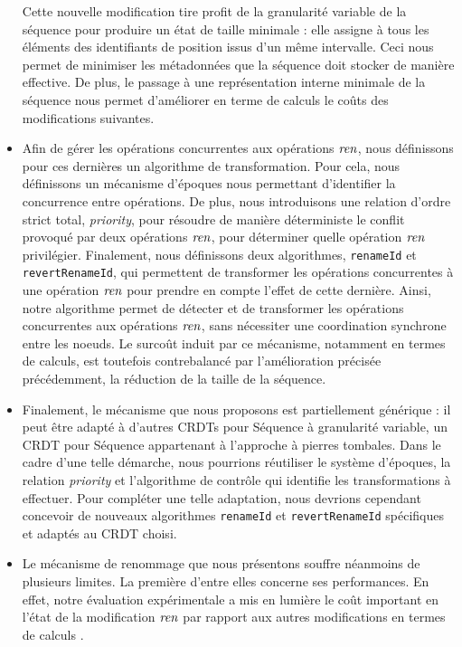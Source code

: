 \begin{itemize}
        Cette nouvelle modification tire profit de la granularité variable de la séquence pour produire un état de taille minimale : elle assigne à tous les éléments des identifiants de position issus d'un même intervalle.
        Ceci nous permet de minimiser les métadonnées que la séquence doit stocker de manière effective.
        De plus, le passage à une représentation interne minimale de la séquence nous permet d'améliorer en terme de calculs le coûts des modifications suivantes.
    \item Afin de gérer les opérations concurrentes aux opérations $\mathit{ren}$, nous définissons pour ces dernières un algorithme de transformation.
        Pour cela, nous définissons un mécanisme d'époques nous permettant d'identifier la concurrence entre opérations.
        De plus, nous introduisons une relation d'ordre strict total, \emph{priority}, pour résoudre de manière déterministe le conflit provoqué par deux opérations $\mathit{ren}$, \ie pour déterminer quelle opération $\mathit{ren}$ privilégier.
        Finalement, nous définissons deux algorithmes, \texttt{renameId} et \texttt{revertRenameId}, qui permettent de transformer les opérations concurrentes à une opération $\mathit{ren}$ pour prendre en compte l'effet de cette dernière.
        Ainsi, notre algorithme permet de détecter et de transformer les opérations concurrentes aux opérations $\mathit{ren}$, sans nécessiter une coordination synchrone entre les noeuds.
        Le surcoût induit par ce mécanisme, notamment en termes de calculs, est toutefois contrebalancé par l'amélioration précisée précédemment, \ie la réduction de la taille de la séquence.
    \item Finalement, le mécanisme que nous proposons est partiellement générique : il peut être adapté à d'autres \acp{CRDT} pour Séquence à granularité variable, \eg un \ac{CRDT} pour Séquence appartenant à l'approche à pierres tombales.
        Dans le cadre d'une telle démarche, nous pourrions réutiliser le système d'époques, la relation \emph{priority} et l'algorithme de contrôle qui identifie les transformations à effectuer.
        Pour compléter une telle adaptation, nous devrions cependant concevoir de nouveaux algorithmes \texttt{renameId} et \texttt{revertRenameId} spécifiques et adaptés au \ac{CRDT} choisi.
    \item Le mécanisme de renommage que nous présentons souffre néanmoins de plusieurs limites.
        La première d'entre elles concerne ses performances.
        En effet, notre évaluation expérimentale a mis en lumière le coût important en l'état de la modification $\mathit{ren}$ par rapport aux autres modifications en termes de calculs .

\end{itemize}
